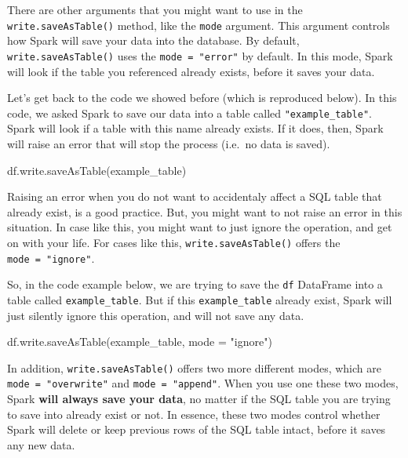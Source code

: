 \documentclass[
  11pt,
  letterpaper,
  DIV=11,
  numbers=noendperiod]{scrreprt}
\newenvironment{Shaded}{\begin{snugshade}}{\end{snugshade}}
\newcommand{\NormalTok}[1]{\textcolor[rgb]{0.00,0.23,0.31}{#1}}
\newcommand{\OperatorTok}[1]{\textcolor[rgb]{0.37,0.37,0.37}{#1}}
\newcommand{\StringTok}[1]{\textcolor[rgb]{0.13,0.47,0.30}{#1}}
\begin{document}
There are other arguments that you might want to use in the
\texttt{write.saveAsTable()} method, like the \texttt{mode} argument.
This argument controls how Spark will save your data into the database.
By default, \texttt{write.saveAsTable()} uses the
\texttt{mode\ =\ "error"} by default. In this mode, Spark will look if
the table you referenced already exists, before it saves your data.

Let's get back to the code we showed before (which is reproduced below).
In this code, we asked Spark to save our data into a table called
\texttt{"example\_table"}. Spark will look if a table with this name
already exists. If it does, then, Spark will raise an error that will
stop the process (i.e.~no data is saved).

\begin{Shaded}
\begin{Highlighting}[]
\NormalTok{df.write.saveAsTable(}\StringTok{\textquotesingle{}example\_table\textquotesingle{}}\NormalTok{)}
\end{Highlighting}
\end{Shaded}

Raising an error when you do not want to accidentaly affect a SQL table
that already exist, is a good practice. But, you might want to not raise
an error in this situation. In case like this, you might want to just
ignore the operation, and get on with your life. For cases like this,
\texttt{write.saveAsTable()} offers the \texttt{mode\ =\ "ignore"}.

So, in the code example below, we are trying to save the \texttt{df}
DataFrame into a table called \texttt{example\_table}. But if this
\texttt{example\_table} already exist, Spark will just silently ignore
this operation, and will not save any data.

\begin{Shaded}
\begin{Highlighting}[]
\NormalTok{df.write.saveAsTable(}\StringTok{\textquotesingle{}example\_table\textquotesingle{}}\NormalTok{, mode }\OperatorTok{=} \StringTok{"ignore"}\NormalTok{)}
\end{Highlighting}
\end{Shaded}

In addition, \texttt{write.saveAsTable()} offers two more different
modes, which are \texttt{mode\ =\ "overwrite"} and
\texttt{mode\ =\ "append"}. When you use one these two modes, Spark
\textbf{will always save your data}, no matter if the SQL table you are
trying to save into already exist or not. In essence, these two modes
control whether Spark will delete or keep previous rows of the SQL table
intact, before it saves any new data.
\end{document}
